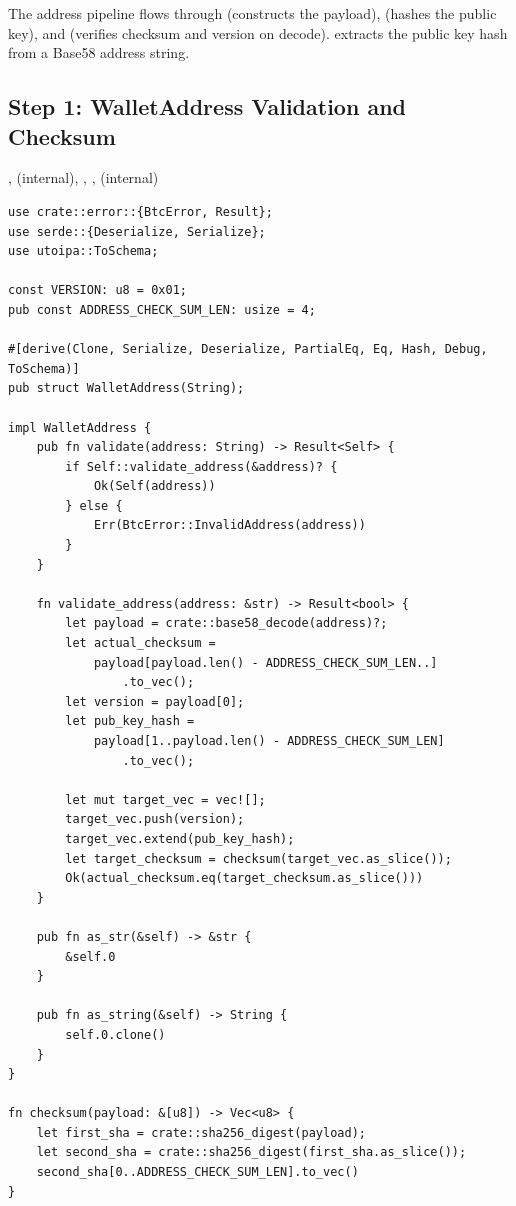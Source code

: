 The address pipeline flows through  (constructs the payload),  (hashes the public key), and  (verifies checksum and version on decode).  extracts the public key hash from a Base58 address string.

\subsection{Step 1: WalletAddress Validation and Checksum}
\label{sec:wallet-address-validation}

\begin{infobox}
,  (internal), , ,  (internal)
\end{infobox}

\begin{listing}[htbp]
\caption{ validation and checksum ()}
\label{lst:ch14-wallet-address}
\begin{verbatim}
use crate::error::{BtcError, Result};
use serde::{Deserialize, Serialize};
use utoipa::ToSchema;

const VERSION: u8 = 0x01;
pub const ADDRESS_CHECK_SUM_LEN: usize = 4;

#[derive(Clone, Serialize, Deserialize, PartialEq, Eq, Hash, Debug, ToSchema)]
pub struct WalletAddress(String);

impl WalletAddress {
    pub fn validate(address: String) -> Result<Self> {
        if Self::validate_address(&address)? {
            Ok(Self(address))
        } else {
            Err(BtcError::InvalidAddress(address))
        }
    }

    fn validate_address(address: &str) -> Result<bool> {
        let payload = crate::base58_decode(address)?;
        let actual_checksum =
            payload[payload.len() - ADDRESS_CHECK_SUM_LEN..]
                .to_vec();
        let version = payload[0];
        let pub_key_hash =
            payload[1..payload.len() - ADDRESS_CHECK_SUM_LEN]
                .to_vec();

        let mut target_vec = vec![];
        target_vec.push(version);
        target_vec.extend(pub_key_hash);
        let target_checksum = checksum(target_vec.as_slice());
        Ok(actual_checksum.eq(target_checksum.as_slice()))
    }

    pub fn as_str(&self) -> &str {
        &self.0
    }

    pub fn as_string(&self) -> String {
        self.0.clone()
    }
}

fn checksum(payload: &[u8]) -> Vec<u8> {
    let first_sha = crate::sha256_digest(payload);
    let second_sha = crate::sha256_digest(first_sha.as_slice());
    second_sha[0..ADDRESS_CHECK_SUM_LEN].to_vec()
}
\end{verbatim}
\end{listing}

